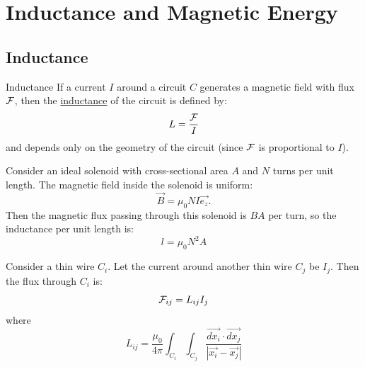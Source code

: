 \documentclass[../Main.tex]{subfiles}
\begin{document}
\section{Inductance and Magnetic Energy}
\subsection{Inductance}
\begin{definition}{Inductance}
    If a current $I$ around a circuit $C$ generates a magnetic field with flux $\mathcal{F}$, then the \underline{inductance} of the circuit is defined by:
    \begin{equation*}
        L = \frac{\mathcal{F}}{I}
    \end{equation*}
    and depends only on the geometry of the circuit (since $\mathcal{F}$ is proportional to $I$).
\end{definition}
\begin{example}
    Consider an ideal solenoid with cross-sectional area $A$ and $N$ turns per unit length. The magnetic field inside the solenoid is uniform:
    \begin{equation*}
        \vec{B} = \mu_0 N I \vec{e_z}.
    \end{equation*}
    Then the magnetic flux passing through this solenoid is $BA$ per turn, so the inductance per unit length is:
    \begin{equation*}
        l = \mu_0 N^2 A
    \end{equation*}
\end{example}
\begin{example}
    Consider a thin wire $C_i$. Let the current around another thin wire $C_j$ be $I_j$. Then the flux through $C_i$ is:
    \begin{equation*}
        \mathcal{F}_{ij} = L_{ij} I_j
    \end{equation*}
    where
    \begin{equation*}
        L_{ij} = \frac{\mu_0}{4\pi} \int_{C_i} \int_{C_j} \frac{\vec{dx_i} \cdot \vec{dx_j}}{|\vec{x_i} - \vec{x_j}|}
    \end{equation*}
\end{example}
\end{document}
